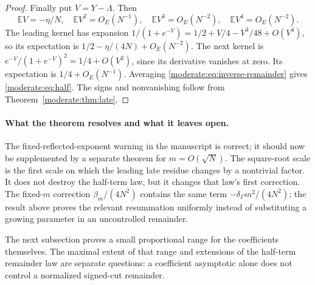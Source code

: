 \begin{proof}
Finally put $V=Y-\Lambda$. Then
\[
 \mathbb EV=-\eta/N,\quad \mathbb EV^2=O_E(N^{-1}),\quad
 \mathbb EV^3=O_E(N^{-2}),\quad \mathbb EV^4=O_E(N^{-2}).
\]
The leading kernel has expansion
$1/(1+e^{-V})=1/2+V/4-V^3/48+O(V^4)$, so its expectation is
$1/2-\eta/(4N)+O_E(N^{-2})$. The next kernel is
$e^{-V}/(1+e^{-V})^2=1/4+O(V^2)$, since its derivative vanishes
at zero. Its expectation is $1/4+O_E(N^{-1})$.
Averaging \eqref{moderate:eq:inverse-remainder} gives
\eqref{moderate:eq:half}. The signs and nonvanishing follow from
Theorem~\ref{moderate:thm:late}.
\end{proof}

\paragraph{What the theorem resolves and what it leaves open.}
The fixed-reflected-exponent warning in the manuscript is correct; it
should now be supplemented by a separate theorem for $m=O(\sqrt N)$.
The square-root scale is the first scale on which the leading late
residue changes by a nontrivial factor. It does not destroy the
half-term law, but it changes that law's first correction. The
fixed-$m$ correction $\beta_m/(4N^2)$ contains the same term
$-\delta_\Gamma m^2/(4N^2)$; the result above proves the relevant
resummation uniformly instead of substituting a growing parameter in
an uncontrolled remainder.

The next subsection proves a small proportional range for the
coefficients themselves. The maximal extent of that range and
extensions of the half-term remainder law are separate questions:
a coefficient asymptotic alone does not control a normalized
signed-cut remainder.
